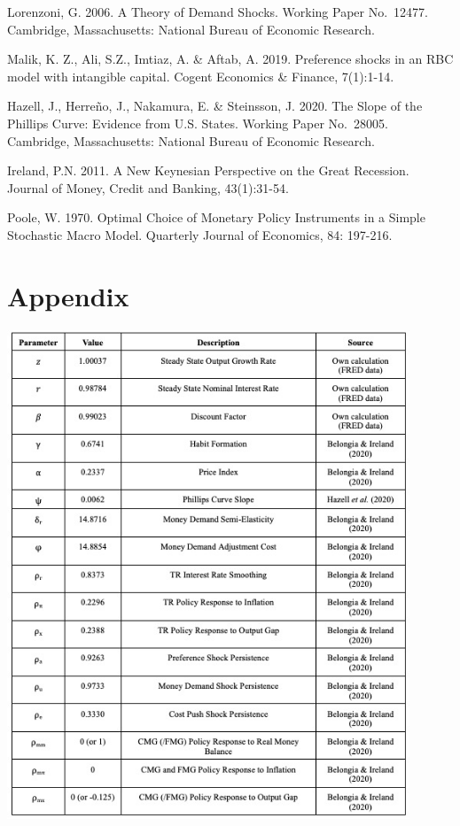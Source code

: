 \documentclass[11pt,preprint, authoryear]{elsarticle}
\let\origfigure\figure
\let\endorigfigure\endfigure
\renewenvironment{figure}[1][2] {
    \expandafter\origfigure\expandafter[H]
} {
    \endorigfigure
}
\numberwithin{equation}{section}
\numberwithin{figure}{section}
\numberwithin{table}{section}
\begin{document}
Lorenzoni, G. 2006. A Theory of Demand Shocks. Working Paper No.~12477.
Cambridge, Massachusetts: National Bureau of Economic Research.

Malik, K. Z., Ali, S.Z., Imtiaz, A. \& Aftab, A. 2019. Preference shocks
in an RBC model with intangible capital. Cogent Economics \& Finance,
7(1):1-14.

Hazell, J., Herreño, J., Nakamura, E. \& Steinsson, J. 2020. The Slope
of the Phillips Curve: Evidence from U.S. States. Working Paper
No.~28005. Cambridge, Massachusetts: National Bureau of Economic
Research.

Ireland, P.N. 2011. A New Keynesian Perspective on the Great Recession.
Journal of Money, Credit and Banking, 43(1):31-54.

Poole, W. 1970. Optimal Choice of Monetary Policy Instruments in a
Simple Stochastic Macro Model. Quarterly Journal of Economics, 84:
197-216.

\newpage

\hypertarget{appendix}{%
\section{Appendix}\label{appendix}}

\begin{figure}
\centering
\includegraphics[width=0.9\textwidth,height=0.7\textheight]{./figures/table-param.jpeg}
\caption{Parameter Values}
\end{figure}


\end{document}
